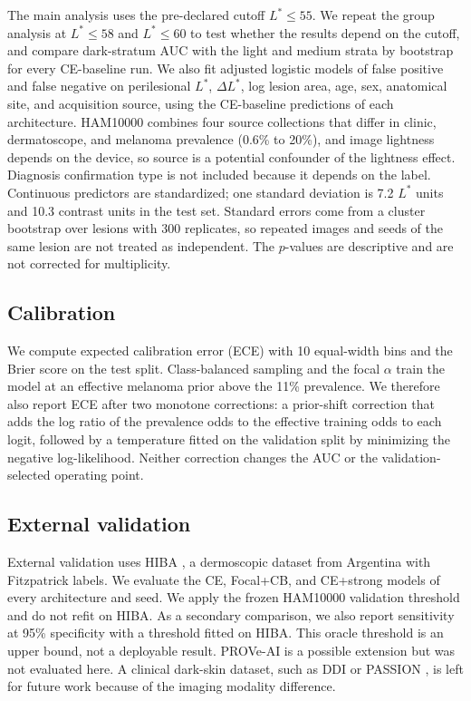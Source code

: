The main analysis uses the pre-declared cutoff $L^*\leq55$. We repeat the group analysis at $L^*\leq58$ and $L^*\leq60$ to test whether the results depend on the cutoff, and compare dark-stratum AUC with the light and medium strata by bootstrap for every CE-baseline run. We also fit adjusted logistic models of false positive and false negative on perilesional $L^*$, $\Delta L^*$, log lesion area, age, sex, anatomical site, and acquisition source, using the CE-baseline predictions of each architecture. HAM10000 combines four source collections that differ in clinic, dermatoscope, and melanoma prevalence (0.6\% to 20\%), and image lightness depends on the device, so source is a potential confounder of the lightness effect. Diagnosis confirmation type is not included because it depends on the label. Continuous predictors are standardized; one standard deviation is 7.2 $L^*$ units and 10.3 contrast units in the test set. Standard errors come from a cluster bootstrap over lesions with 300 replicates, so repeated images and seeds of the same lesion are not treated as independent. The $p$-values are descriptive and are not corrected for multiplicity.

\subsection{Calibration}

We compute expected calibration error (ECE) with 10 equal-width bins and the Brier score on the test split. Class-balanced sampling and the focal $\alpha$ train the model at an effective melanoma prior above the 11\% prevalence. We therefore also report ECE after two monotone corrections: a prior-shift correction that adds the log ratio of the prevalence odds to the effective training odds to each logit, followed by a temperature fitted on the validation split by minimizing the negative log-likelihood. Neither correction changes the AUC or the validation-selected operating point.

\subsection{External validation}

External validation uses HIBA \citep{hiba2023}, a dermoscopic dataset from Argentina with Fitzpatrick labels. We evaluate the CE, Focal+CB, and CE+strong models of every architecture and seed. We apply the frozen HAM10000 validation threshold and do not refit on HIBA. As a secondary comparison, we also report sensitivity at 95\% specificity with a threshold fitted on HIBA. This oracle threshold is an upper bound, not a deployable result. PROVe-AI \citep{proveai2023} is a possible extension but was not evaluated here. A clinical dark-skin dataset, such as DDI \citep{daneshjou2022ddi} or PASSION \citep{passion2024}, is left for future work because of the imaging modality difference.

